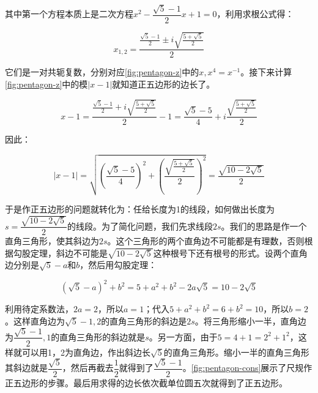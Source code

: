 \documentclass[b5paper]{ctexart}
\begin{document}
其中第一个方程本质上是二次方程$x^2 - \dfrac{\sqrt{5} - 1}{2}x + 1 = 0$，利用求根公式得：

\[x_{1, 2} = \dfrac{\frac{\sqrt{5} - 1}{2} \pm i\sqrt{\frac{5 + \sqrt{5}}{2}}}{2}
\]

它们是一对共轭复数，分别对应\cref{fig:pentagon-z}中的$x, x^4 = x^{-1}$。接下来计算\cref{fig:pentagon-z}中的模$|x - 1|$就知道正五边形的边长了。

\[
x - 1 = \frac{\frac{\sqrt{5} - 1}{2} + i\sqrt{\frac{5 + \sqrt{5}}{2}}}{2} - 1 = \frac{\sqrt{5} - 5}{4} + i\frac{\sqrt{\frac{5 + \sqrt{5}}{2}}}{2}
\]

因此：

\[
|x - 1| = \sqrt{(\frac{\sqrt{5} - 5}{4})^2 + (\frac{\sqrt{\frac{5 + \sqrt{5}}{2}}}{2})^2} = \frac{\sqrt{10 - 2\sqrt{5}}}{2}
\]

于是作正五边形的问题就转化为：任给长度为1的线段，如何做出长度为$s = \dfrac{\sqrt{10 - 2\sqrt{5}}}{2}$的线段。为了简化问题，我们先求线段$2s$。我们的思路是作一个直角三角形，使其斜边为$2s$。这个三角形的两个直角边不可能都是有理数，否则根据勾股定理，斜边不可能是$\sqrt{10 - 2\sqrt{5}}$这种根号下还有根号的形式。设两个直角边分别是$\sqrt{5} - a$和$b$，然后用勾股定理：

\[
(\sqrt{5} - a)^2 + b^2 = 5 + a^2 + b^2 - 2a\sqrt{5} = 10 - 2\sqrt{5}
\]

利用待定系数法，$2a = 2$，所以$a = 1$；代入$5 + a^2 + b^2 = 6 + b^2 = 10$，所以$b = 2$。这样直角边为$\sqrt{5} - 1, 2$的直角三角形的斜边是$2s$。将三角形缩小一半，直角边为$\dfrac{\sqrt{5} - 1}{2}, 1$的直角三角形的斜边就是$s$。另一方面，由于$5 = 4 + 1 = 2^2 + 1^2$，这样就可以用1，2为直角边，作出斜边长$\sqrt{5}$的直角三角形。缩小一半的直角三角形其斜边就是$\dfrac{\sqrt{5}}{2}$，然后再截去$\dfrac{1}{2}$就得到了$\dfrac{\sqrt{5} - 1}{2}$。\cref{fig:pentagon-cons}展示了尺规作正五边形的步骤。最后用求得的边长依次截单位圆五次就得到了正五边形。
\end{document}
